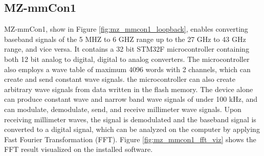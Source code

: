 \documentclass[a4paper,12pt]{report}
\begin{document}
\subsection{MZ-mmCon1}

MZ-mmCon1, show in Figure \ref{fig:mz_mmcon1_loopback},
enables converting baseband signals of the 5 MHZ to 6 GHZ range
up to the 27 GHz to 43 GHz range, and vice versa.
It contains a 32 bit STM32F microcontroller
containing both 12 bit analog to digital, digital to analog converters.
The microcontroller also employs
a wave table of maximum 4096 words with 2 channels,
which can create and send constant wave signals.
the microcontroller can also create arbitrary wave signals from
data written in the flash memory.
The device alone can produce constant wave and narrow band wave signals
of under 100 kHz, and can modulate, demodulate, send, and receive
millimeter wave signals.
Upon receiving millimeter waves,
the signal is demodulated and the baseband signal is converted to a digital signal,
which can be analyzed on the computer by applying Fast Fourier Transformation (FFT).
Figure \ref{fig:mz_mmcon1_fft_viz} shows the FFT result visualized on the installed software.
\end{document}
